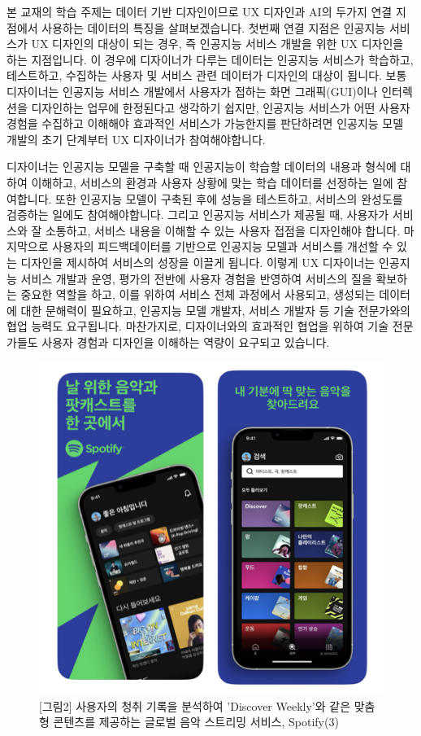 \documentclass[
  letterpaper,
]{book}
\begin{document}
본 교재의 학습 주제는 데이터 기반 디자인이므로 UX 디자인과 AI의 두가지
연결 지점에서 사용하는 데이터의 특징을 살펴보겠습니다. 첫번째 연결
지점은 인공지능 서비스가 UX 디자인의 대상이 되는 경우, 즉 인공지능
서비스 개발을 위한 UX 디자인을 하는 지점입니다. 이 경우에 디자이너가
다루는 데이터는 인공지능 서비스가 학습하고, 테스트하고, 수집하는 사용자
및 서비스 관련 데이터가 디자인의 대상이 됩니다. 보통 디자이너는 인공지능
서비스 개발에서 사용자가 접하는 화면 그래픽(GUI)이나 인터렉션을
디자인하는 업무에 한정된다고 생각하기 쉽지만, 인공지능 서비스가 어떤
사용자 경험을 수집하고 이해해야 효과적인 서비스가 가능한지를 판단하려면
인공지능 모델 개발의 초기 단계부터 UX 디자이너가 참여해야합니다.

디자이너는 인공지능 모델을 구축할 때 인공지능이 학습할 데이터의 내용과
형식에 대하여 이해하고, 서비스의 환경과 사용자 상황에 맞는 학습 데이터를
선정하는 일에 참여합니다. 또한 인공지능 모델이 구축된 후에 성능을
테스트하고, 서비스의 완성도를 검증하는 일에도 참여해야합니다. 그리고
인공지능 서비스가 제공될 때, 사용자가 서비스와 잘 소통하고, 서비스
내용을 이해할 수 있는 사용자 접점을 디자인해야 합니다. 마지막으로
사용자의 피드백데이터를 기반으로 인공지능 모델과 서비스를 개선할 수 있는
디자인을 제시하여 서비스의 성장을 이끌게 됩니다. 이렇게 UX 디자이너는
인공지능 서비스 개발과 운영, 평가의 전반에 사용자 경험을 반영하여
서비스의 질을 확보하는 중요한 역할을 하고, 이를 위하여 서비스 전체
과정에서 사용되고, 생성되는 데이터에 대한 문해력이 필요하고, 인공지능
모델 개발자, 서비스 개발자 등 기술 전문가와의 협업 능력도 요구됩니다.
마찬가지로, 디자이너와의 효과적인 협업을 위하여 기술 전문가들도 사용자
경험과 디자인을 이해하는 역량이 요구되고 있습니다.

\begin{figure}[H]

{\centering \includegraphics{img/fig2.png}

}

\caption{{[}그림2{]} 사용자의 청취 기록을 분석하여 'Discover Weekly'와
같은 맞춤형 콘텐츠를 제공하는 글로벌 음악 스트리밍 서비스, Spotify(3)}

\end{figure}%
\end{document}
